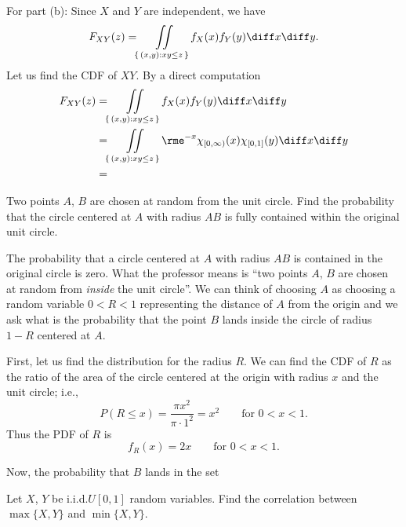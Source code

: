 \begin{solution}
  For part (b): Since \(X\) and \(Y\) are independent, we have
  \[
    F_{XY}(z)=\iint\limits_{\{\,(x,y):xy\leq z\,\}} f_X(x)f_Y(y)\diff x\diff y.
  \]
  Let us find the CDF of \(XY\). By a direct computation
  \begin{align*}
    F_{XY}(z)
    &=\iint\limits_{\{\,(x,y):xy\leq z\,\}} f_X(x)f_Y(y)\diff x\diff y\\
    &=\iint\limits_{\{\,(x,y):xy\leq z\,\}} \rme^{-x}\chi_{[0,\infty)}(x)\chi_{[0,1]}(y)
      \diff x\diff y\\
    &=
  \end{align*}
\end{solution}
\newpage

\begin{problem}[Handout 17, \# 18]
  Two points \(A\), \(B\) are chosen at random from the unit circle. Find
  the probability that the circle centered at \(A\) with radius \(AB\) is
  fully contained within the original unit circle.
\end{problem}
\begin{solution}
  The probability that a circle centered at \(A\) with radius \(AB\) is
  contained in the original circle is zero. What the professor means is
  ``two points \(A\), \(B\) are chosen at random from \emph{inside} the
  unit circle''. We can think of choosing \(A\) as choosing a random
  variable \(0<R<1\) representing the distance of \(A\) from the origin and
  we ask what is the probability that the point \(B\) lands inside the
  circle of radius \(1-R\) centered at \(A\).

  First, let us find the distribution for the radius \(R\). We can find the
  CDF of \(R\) as the ratio of the area of the circle centered at the
  origin with radius \(x\) and the unit circle; i.e.,
  \[
    P(R\leq x)=\frac{\pi x^2}{\pi\cdot 1^2}=x^2\qquad \text{for \(0<x<1\).}
  \]
  Thus the PDF of \(R\) is
  \[
    f_R(x)=2x\qquad\text{for \(0<x<1\).}
  \]

  Now, the probability that \(B\) lands in the set
\end{solution}
\newpage

\begin{problem}[Handout 17, \# 19]
  Let \(X\), \(Y\) be i.i.d.\@ \(U[0,1]\) random variables. Find the
  correlation between \(\max\{X,Y\}\) and \(\min\{X,Y\}\).
\end{problem}
\begin{solution}
\end{solution}

